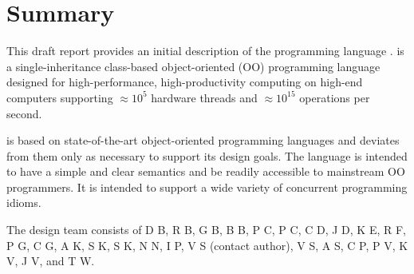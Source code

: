 
\thispagestyle{empty}




\chapter*{Summary}
This draft report provides an initial description of the programming
language \Xten. \Xten{} is a single-inheritance class-based object-oriented
(OO) programming language designed for high-performance, high-productivity
computing on high-end computers supporting $\approx 10^5$ hardware threads
and $\approx 10^{15}$ operations per second. 

{}\Xten{} is based on state-of-the-art object-oriented programming
languages and deviates from them only as necessary to support its
design goals. The language is intended to have a simple and clear
semantics and be readily accessible to mainstream OO programmers. It
is intended to support a wide variety of concurrent programming
idioms.


The \Xten{} design team consists of
D B, 
R B, 
G B, 
B B, 
P C, 
P C, 
C D, 
J D, 
K E,
R F,
P G, 
C G, 
A K, 
S K, 
S K, 
N N, 
I P, 
V S (contact author), 
V S,
A S,  
C P,
P V,
K V,
J V, and
T W.

